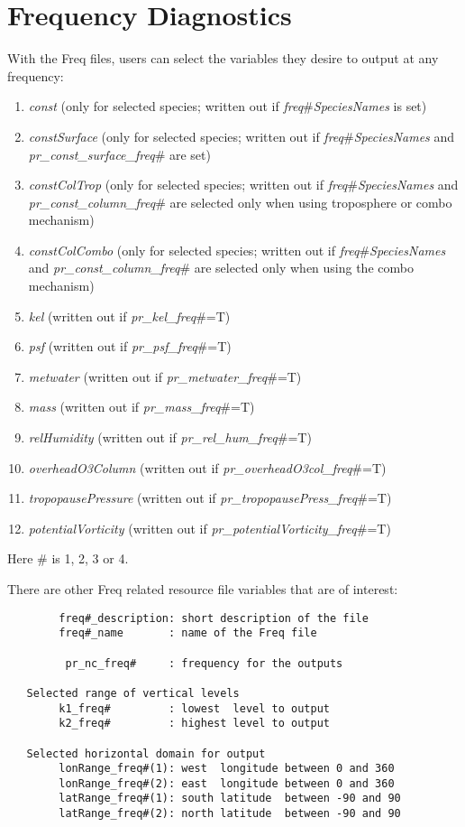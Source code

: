 \section{Frequency Diagnostics}
With the Freq files, users can select the variables they desire
to output at any frequency:
\begin{enumerate}
\item {\em const} (only for selected species; written out if {\em freq$\#$SpeciesNames} is set)
\item {\em constSurface} (only for selected species; written out if {\em freq$\#$SpeciesNames} and {\em pr\_const\_surface\_freq$\#$} are set)
\item {\em constColTrop} (only for selected species; written out if {\em freq$\#$SpeciesNames}  and {\em pr\_const\_column\_freq$\#$} are selected  only when using troposphere or combo mechanism)
\item {\em constColCombo} (only for selected species; written out if {\em freq$\#$SpeciesNames}  and {\em pr\_const\_column\_freq$\#$} are selected only when using the combo mechanism)
\item {\em kel}       (written out if {\em pr\_kel\_freq$\#$}=T)
\item {\em psf}       (written out if {\em pr\_psf\_freq$\#$}=T)
\item {\em metwater} (written out if {\em pr\_metwater\_freq$\#$}=T)
\item {\em mass}       (written out if {\em pr\_mass\_freq$\#$}=T)
\item {\em relHumidity}      (written out if {\em pr\_rel\_hum\_freq$\#$}=T)
\item {\em overheadO3Column}   (written out if {\em pr\_overheadO3col\_freq$\#$}=T)
\item {\em tropopausePressure} (written out if {\em pr\_tropopausePress\_freq$\#$}=T)
\item {\em potentialVorticity} (written out if {\em pr\_potentialVorticity\_freq$\#$}=T)
\end{enumerate}
%
Here  $\#$ is 1, 2, 3 or 4.

There are other Freq related resource file variables that are of interest:
%
\begin{verbatim}
        freq#_description: short description of the file
        freq#_name       : name of the Freq file

         pr_nc_freq#     : frequency for the outputs

   Selected range of vertical levels
        k1_freq#         : lowest  level to output
        k2_freq#         : highest level to output

   Selected horizontal domain for output
        lonRange_freq#(1): west  longitude between 0 and 360
        lonRange_freq#(2): east  longitude between 0 and 360
        latRange_freq#(1): south latitude  between -90 and 90
        latRange_freq#(2): north latitude  between -90 and 90
\end{verbatim}


